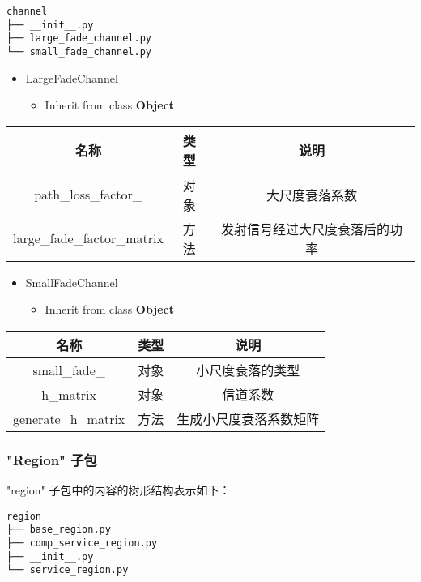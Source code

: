 \documentclass[11pt]{article}
\providecommand{\tightlist}{%
      \setlength{\itemsep}{0pt}\setlength{\parskip}{0pt}}
\begin{document}
\begin{verbatim}
channel
├── __init__.py
├── large_fade_channel.py
└── small_fade_channel.py
\end{verbatim}

\begin{itemize}
\tightlist
\item
  LargeFadeChannel

  \begin{itemize}
  \tightlist
  \item
    Inherit from class \textbf{Object}
  \end{itemize}
\end{itemize}

\begin{longtable}[c]{@{}ccc@{}}
\toprule
名称 & 类型 & 说明\tabularnewline
\midrule
\endhead
path\_loss\_factor\_ & 对象 & 大尺度衰落系数\tabularnewline
large\_fade\_factor\_matrix & 方法 &
发射信号经过大尺度衰落后的功率\tabularnewline
\bottomrule
\end{longtable}

\begin{itemize}
\tightlist
\item
  SmallFadeChannel

  \begin{itemize}
  \tightlist
  \item
    Inherit from class \textbf{Object}
  \end{itemize}
\end{itemize}

\begin{longtable}[c]{@{}ccc@{}}
\toprule
名称 & 类型 & 说明\tabularnewline
\midrule
\endhead
small\_fade\_ & 对象 & 小尺度衰落的类型\tabularnewline
h\_matrix & 对象 & 信道系数\tabularnewline
generate\_h\_matrix & 方法 & 生成小尺度衰落系数矩阵\tabularnewline
\bottomrule
\end{longtable}

    \subsubsection{"Region" 子包}\label{region-ux5b50ux5305}

"region" 子包中的内容的树形结构表示如下：

\begin{verbatim}
region
├── base_region.py
├── comp_service_region.py
├── __init__.py
└── service_region.py
\end{verbatim}
\end{document}
